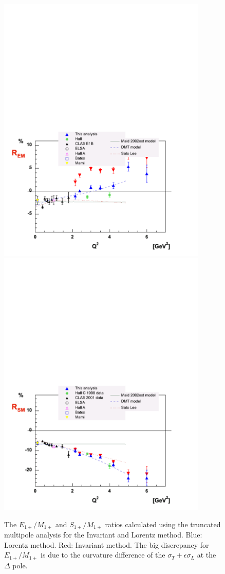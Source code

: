 \begin{figure}[h]
 \begin{center}
  \includegraphics[width = 10cm, bb = 0 0 600 460]{systematics/img/ratios_e1om1_mm0.080_ct0.95_L2}
  \includegraphics[width = 10cm, bb = 0 0 600 460]{systematics/img/ratios_s1om1_mm0.080_ct0.95_L2}
  \caption{The $E_{1+}/M_{1+}$ and $S_{1+}/M_{1+}$ ratios calculated using the truncated multipole 
           analysis for the Invariant and Lorentz method.
           Blue: Lorentz method. Red: Invariant method. The big discrepancy for $E_{1+}/M_{1+}$ is due to the curvature difference of the  
           $\sigma_T + \epsilon\sigma_L$ at the $\Delta$ pole.}
  \label{fig:cmthetares}
 \end{center}
\end{figure} 

